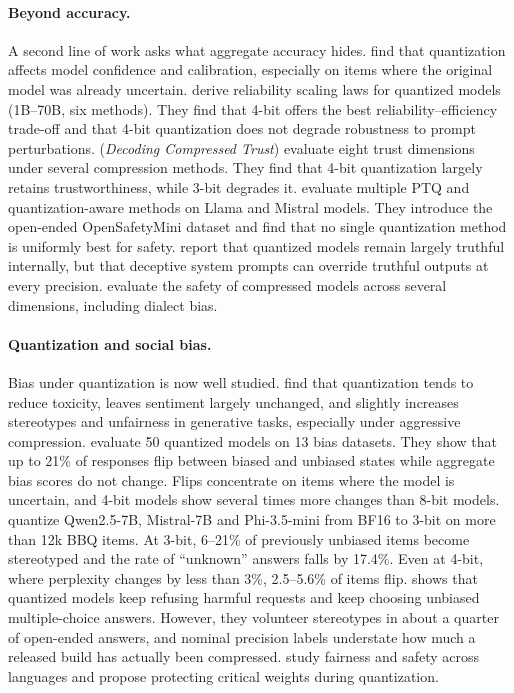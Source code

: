 \paragraph{Beyond accuracy.} A second line of work asks what aggregate accuracy hides.
\citet{proskurina2024quantization} find that quantization affects model confidence
and calibration, especially on items where the original model was already uncertain.
\citet{ayadi2026reliability} derive reliability scaling laws for quantized models
(1B--70B, six methods). They find that 4-bit offers the best reliability--efficiency
trade-off and that 4-bit quantization does not degrade robustness to prompt
perturbations. \citet{hong2024decoding} (\emph{Decoding Compressed Trust}) evaluate
eight trust dimensions under several compression methods. They find that 4-bit
quantization largely retains trustworthiness, while 3-bit degrades it.
\citet{kharinaev2025investigating} evaluate multiple PTQ and quantization-aware
methods on Llama and Mistral models. They introduce the open-ended OpenSafetyMini
dataset and find that no single quantization method is uniformly best for safety.
\citet{fu2025quantized} report that quantized models remain largely truthful
internally, but that deceptive system prompts can override truthful outputs at
every precision. \citet{xu2024beyond} evaluate the safety of compressed models
across several dimensions, including dialect bias.

\paragraph{Quantization and social bias.} Bias under quantization is now well
studied. \citet{marcuzzi2026quantization} find that quantization tends to reduce
toxicity, leaves sentiment largely unchanged, and slightly increases stereotypes and
unfairness in generative tasks, especially under aggressive compression.
\citet{hua2026uncertainty} evaluate 50 quantized models on 13 bias datasets. They
show that up to 21\% of responses flip between biased and unbiased states while
aggregate bias scores do not change. Flips concentrate on items where the model is
uncertain, and 4-bit models show several times more changes than 8-bit models.
\citet{rath2026quantization} quantize Qwen2.5-7B, Mistral-7B and Phi-3.5-mini from
BF16 to 3-bit on more than 12k BBQ items. At 3-bit, 6--21\% of previously unbiased
items become stereotyped and the rate of ``unknown'' answers falls by 17.4\%. Even
at 4-bit, where perplexity changes by less than 3\%, 2.5--5.6\% of items flip.
\citet{ferrara2026quantibias} shows that quantized models keep refusing harmful
requests and keep choosing unbiased multiple-choice answers. However, they volunteer
stereotypes in about a quarter of open-ended answers, and nominal precision labels
understate how much a released build has actually been compressed.
\citet{alhakim2026preserving} study fairness and safety across languages and propose
protecting critical weights during quantization.

